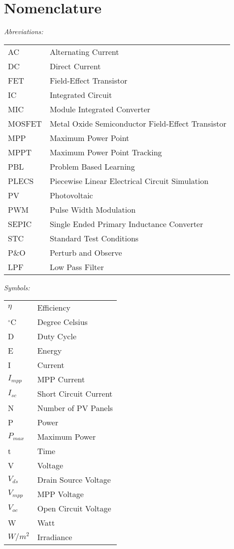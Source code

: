\chapter*{Nomenclature}

\vspace{-10mm} %
\textit{Abreviations:}\newline
\begin{tabular}{ll} %
AC & Alternating Current\\
DC & Direct Current\\
FET & Field-Effect Transistor\\
IC & Integrated Circuit\\
MIC & Module Integrated Converter\\
MOSFET & Metal Oxide Semiconductor Field-Effect Transistor\\
MPP & Maximum Power Point\\
MPPT & Maximum Power Point Tracking\\
PBL & Problem Based Learning\\
PLECS & Piecewise Linear Electrical Circuit Simulation\\
PV & Photovoltaic\\
PWM & Pulse Width Modulation\\
SEPIC & Single Ended Primary Inductance Converter\\
STC & Standard Test Conditions\\
P\&O & Perturb and Observe\\
LPF & Low Pass Filter
\end{tabular}

\vspace{5mm} %

\noindent\textit{Symbols:}\newline
\begin{tabular}{ll}
$\eta$ & Efficiency\\
$^\circ$C & Degree Celsius\\
D & Duty Cycle\\
E & Energy\\
I & Current\\
$I_{mpp}$ & MPP Current\\
$I_{sc}$ & Short Circuit Current\\
N & Number of PV Panels \\
P & Power\\
$P_{max}$ & Maximum Power\\
t & Time\\
V & Voltage\\
$V_{ds}$ & Drain Source Voltage\\
$V_{mpp}$ & MPP Voltage\\
$V_{oc}$ & Open Circuit Voltage\\
W & Watt\\
$W/m^2$ & Irradiance\\
\end{tabular}